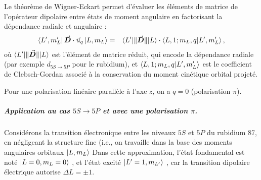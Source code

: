 \medskip

Le théorème de Wigner-Eckart permet d’évaluer les éléments de matrice de l’opérateur dipolaire entre états de moment angulaire en factorisant la dépendance radiale et angulaire :
\begin{eqnarray}
\bra{L', m_{L}'} \vec{{\bm{D}}} \cdot \vec{u}_q \ket{L, m_L}
& = & \bra{L'}\!\|\vec{{\bm{D}}}\|\!\ket{L} \cdot \braket{L, 1; m_L, q | L', m_{L}'} , 
\label{eq:WignerEckart}
\end{eqnarray}
où $\bra{L'}\!\|\vec{{\bm{D}}}\|\!\ket{L}$ est l’élément de matrice réduit, qui encode la dépendance radiale (par exemple $d_{\scriptstyle 5S \rightarrow 5P}$ pour le rubidium), et $\braket{L, 1; m_L, q | L', m_{L}'}$ est le coefficient de Clebsch-Gordan associé à la conservation du moment cinétique orbital projeté.

\medskip
Pour une polarisation linéaire parallèle à l’axe $z$, on a $q=0$ (polarisation $\pi$).

\subparagraph{Application au cas $5S \rightarrow 5P$ et avec une polarisation $\pi$.}


Considérons la transition électronique entre les niveaux $5S$ et $5P$ du rubidium 87, en négligeant la structure fine (i.e., on travaille dans la base des moments angulaires orbitaux $\ket{L , m_L  } $
Dans cette approximation, l'état fondamental est noté $\ket{L = 0, m_L = 0}$ , et l’état excité $\ket{L' = 1, m_{L'}}$ , car la transition dipolaire électrique autorise $\Delta L = \pm 1 $.



